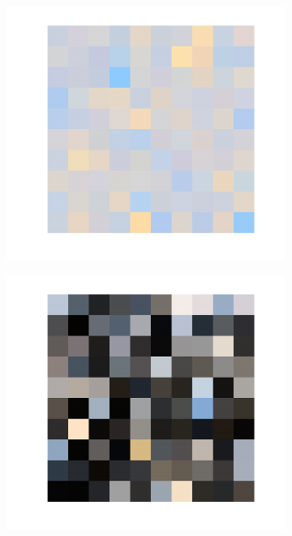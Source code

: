 \documentclass{jov}
\begin{document}
\begin{figure}
\begin{subfigure}[b]{0.24 \textwidth}
        \label{fig:xyDiagram}
    \end{subfigure}
      	\begin{subfigure}[b]{0.24 \textwidth}
    \centering
        \caption{}
        \includegraphics[width=\textwidth]{../Figures/Figure6/Figure6_c.pdf}
        \label{fig:sRGBIlluminant}
        \end{subfigure}
      	\begin{subfigure}[b]{0.24 \textwidth}
    \centering
        \caption{}
        \includegraphics[width=\textwidth]{../Figures/Figure6/Figure6_d.pdf}

\end{subfigure}
\end{figure}
\end{document}
